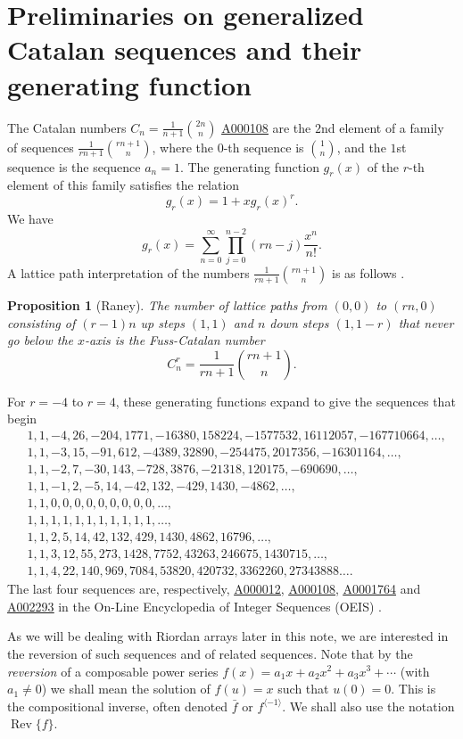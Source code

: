 \documentclass[12pt,reqno]{article}
\newtheorem{proposition}[theorem]{Proposition}
\theoremstyle{definition}
\DeclareMathOperator{\Rev}{Rev}
\newcommand{\seqnum}[1]{\href{http://oeis.org/#1}{\underline{#1}}}
\begin{document}
\section{Preliminaries on generalized Catalan sequences and their generating function}
The Catalan numbers $C_n=\frac{1}{n+1}\binom{2n}{n}$ \seqnum{A000108} are the $2$nd element of a family of sequences $\frac{1}{rn+1} \binom{rn+1}{n}$, where the $0$-th sequence is $\binom{1}{n}$, and the $1$st sequence is the sequence $a_n=1$. The generating function $g_r(x)$ of the $r$-th element of this family satisfies the relation
$$g_r(x)=1+x g_r(x)^r.$$
We have \cite{Conc}
$$g_r(x)=\sum_{n=0}^{\infty} \prod_{j=0}^{n-2} (rn-j)\frac{x^n}{n!}.$$
A lattice path interpretation of the numbers $\frac{1}{rn+1} \binom{rn+1}{n}$ is as follows \cite{Ehr, Conc}.
\begin{proposition} [Raney] The number of lattice paths from $(0,0)$ to $(rn,0)$ consisting of $(r-1)n$ up steps $(1,1)$ and $n$ down steps $(1,1-r)$ that never go below the $x$-axis is the Fuss-Catalan number
$$C_n^r=\frac{1}{rn+1}\binom{rn+1}{n}.$$
\end{proposition}
For $r=-4$ to $r=4$, these generating functions expand to give the sequences that begin
\begin{align*}&1, 1, -4, 26, -204, 1771, -16380, 158224, -1577532, 16112057, -167710664,\ldots,\\
&1, 1, -3, 15, -91, 612, -4389, 32890, -254475, 2017356, -16301164,\ldots,\\
&1, 1, -2, 7, -30, 143, -728, 3876, -21318, 120175, -690690,\ldots,\\
&1, 1, -1, 2, -5, 14, -42, 132, -429, 1430, -4862,\ldots,\\
&1, 1, 0, 0, 0, 0, 0, 0, 0, 0, 0,\ldots,\\
&1, 1, 1, 1, 1, 1, 1, 1, 1, 1, 1,\ldots,\\
&1, 1, 2, 5, 14, 42, 132, 429, 1430, 4862, 16796,\ldots,\\
&1, 1, 3, 12, 55, 273, 1428, 7752, 43263, 246675, 1430715,\ldots,\\
&1, 1, 4, 22, 140, 969, 7084, 53820, 420732, 3362260, 27343888\ldots.\end{align*}
The last four sequences are, respectively, \seqnum{A000012}, \seqnum{A000108}, \seqnum{A0001764} and \seqnum{A002293} in the On-Line Encyclopedia of Integer Sequences (OEIS) \cite{SL1, SL2}.

As we will be dealing with Riordan arrays \cite{book, book2} later in this note, we are interested in the reversion of such sequences and of related sequences. Note that by the \emph{reversion} of a composable power series $f(x)=a_1 x+ a_2x^2+ a_3x^3+\cdots$ (with $a_1 \ne 0$) we shall mean the solution of $f(u)=x$ such that $u(0)=0$. This is the compositional inverse, often denoted $\bar{f}$ or $f^{\langle -1 \rangle}$. We shall also use the notation $\Rev\{f\}$.
\end{document}
